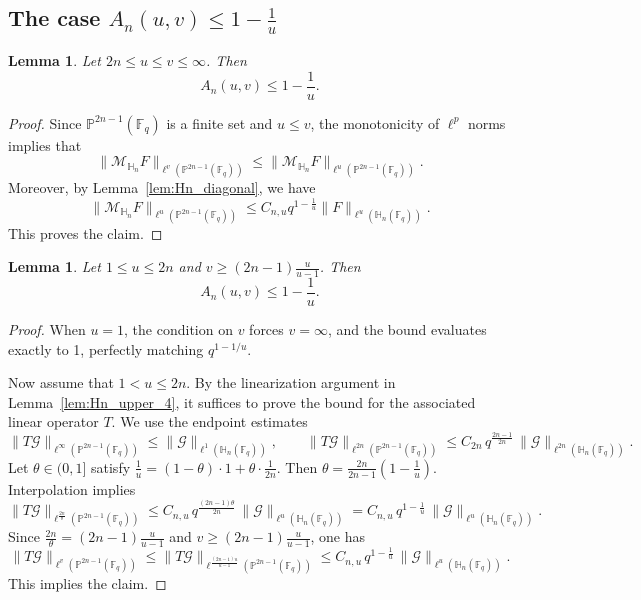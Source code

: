 \documentclass[11pt]{article}
\newtheorem{lemma}[theorem]{Lemma}
\newcommand{\1}{\mathbf 1}
\begin{document}
\subsection{The case $A_n(u,v)\le 1-\frac1u$}
\begin{lemma}\label{lem:Hn_upper_2}
Let $2n\le u\le v\le \infty$.
Then
\[
A_n(u,v)\le 1-\frac1u.
\]
\end{lemma}

\begin{proof}
Since $\mathbb{P}^{2n-1}(\mathbb{F}_q)$ is a finite set and $u \le v$, the monotonicity of $\ell^p$ norms implies that
$$ \|\mathcal{M}_{\mathbb{H}_n}F\|_{\ell^v(\mathbb{P}^{2n-1}(\mathbb{F}_q))}\le \|\mathcal{M}_{\mathbb{H}_n}F\|_{\ell^u(\mathbb{P}^{2n-1}(\mathbb{F}_q))}. $$
Moreover, by Lemma~\ref{lem:Hn_diagonal}, we have
$$ \|\mathcal{M}_{\mathbb{H}_n}F\|_{\ell^u(\mathbb{P}^{2n-1}(\mathbb{F}_q))}\le C_{n,u} q^{1-\frac{1}{u}}\|F\|_{\ell^u(\mathbb{H}_n(\mathbb{F}_q))}. 
$$
This proves the claim.
\end{proof}

\begin{lemma}\label{lem:Hn_upper_5}
Let $1\le u\le 2n$ and $v\ge (2n-1)\frac{u}{u-1}$.
Then
\[
A_n(u,v)\le 1-\frac1u.
\]
\end{lemma}

\begin{proof}
When $u=1$, the condition on $v$ forces $v=\infty$, and the bound evaluates exactly to 1, perfectly matching $q^{1-1/u}$. 

Now assume that $1<u\le 2n$.
By the linearization argument in Lemma~\ref{lem:Hn_upper_4}, it suffices to prove the bound for the associated linear operator $T$.
We use the endpoint estimates
\[
\|T \mathcal G\|_{\ell^\infty(\mathbb{P}^{2n-1}(\mathbb{F}_q))}\le \|\mathcal G\|_{\ell^1(\mathbb{H}_n(\mathbb{F}_q))},
\qquad
\|T\mathcal G\|_{\ell^{2n}(\mathbb{P}^{2n-1}(\mathbb{F}_q))}\le C_{2n}\, q^{\frac{2n-1}{2n}}\, \|\mathcal G\|_{\ell^{2n}(\mathbb{H}_n(\mathbb{F}_q))}.
\]
Let $\theta\in (0,1]$ satisfy $\frac1u=(1-\theta)\cdot 1+\theta\cdot\frac1{2n}$.
Then $\theta=\frac{2n}{2n-1}\left(1-\frac1u\right)$.
Interpolation implies
\[
\|T \mathcal G\|_{\ell^{\frac{2n}{\theta}}(\mathbb{P}^{2n-1}(\mathbb{F}_q))}
\le
C_{n,u}\, q^{\frac{(2n-1)\theta}{2n}}\, \|\mathcal G\|_{\ell^u(\mathbb{H}_n(\mathbb{F}_q))}
=
C_{n,u}\, q^{1-\frac{1}{u}}\,\|\mathcal G\|_{\ell^u(\mathbb{H}_n(\mathbb{F}_q))}.
\]
Since $\frac{2n}{\theta}=(2n-1)\frac{u}{u-1}$ and $v\ge (2n-1)\frac{u}{u-1}$, one has
\[
\|T \mathcal G\|_{\ell^v(\mathbb{P}^{2n-1}(\mathbb{F}_q))}
\le \|T \mathcal G\|_{\ell^{\frac{(2n-1)u}{u-1}}(\mathbb{P}^{2n-1}(\mathbb{F}_q))}
\le C_{n,u}\, q^{1-\frac{1}{u}}\, \|\mathcal G\|_{\ell^u(\mathbb{H}_n(\mathbb{F}_q))}.
\]
This implies the claim.
\end{proof}
\end{document}
